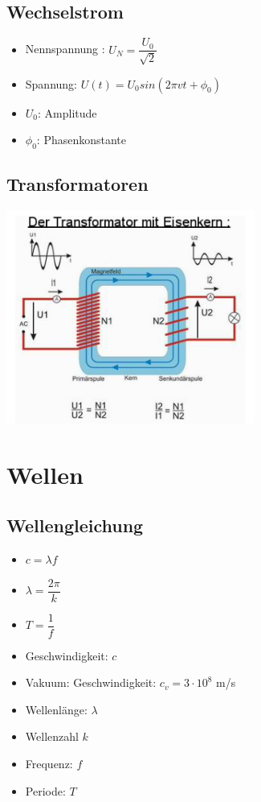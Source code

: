 \documentclass[8pt,a4paper]{scrartcl}
\begin{document}
\begin{multicols*}{3}
				\subsection{Wechselstrom}
					\begin{itemize}\itemsep0pt
						\item Nennspannung : $U_{N} = \dfrac{U_{0}}{\sqrt{2}}$
						\item Spannung: $U(t) = U_{0}sin(2\pi vt + \phi_{0})$
						\item $U_{0}$: Amplitude
						\item $\phi_{0}$: Phasenkonstante
					\end{itemize}	
				\subsection{Transformatoren}
					\includegraphics[height=7cm]{img/transformator.png} 
					
			\section{Wellen}
				\subsection{Wellengleichung}
					\begin{itemize}\itemsep0pt
						\item $c = \lambda f$
						\item $\lambda = \dfrac{2\pi}{k}$
						\item $T = \dfrac{1}{f}$
						\item Geschwindigkeit: $c$
						\item Vakuum: Geschwindigkeit: $c_{v} = 3\cdot 10^{8}$ m/s 
						\item Wellenlänge: $\lambda$ 
						\item Wellenzahl $k$ 
						\item Frequenz: $f$
						\item Periode: $T$
					\end{itemize}	
				

\end{multicols*}
\end{document}

